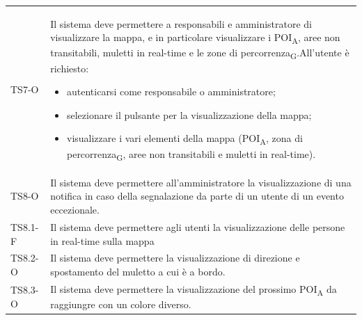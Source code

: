 \begin{longtable}{ >{\centering}p{} >{}p{}}
	TS7-O & Il sistema deve permettere a responsabili e amministratore di visualizzare la mappa, e in particolare visualizzare i POI\textsubscript{A}, aree non transitabili, muletti in real-time e le zone di percorrenza\textsubscript{G}.\newline All'utente è richiesto:\begin{itemize} \item autenticarsi come responsabile o amministratore; \item selezionare il pulsante per la visualizzazione della mappa; \item visualizzare i vari elementi della mappa (POI\textsubscript{A}, zona di percorrenza\textsubscript{G}, aree non transitabili e muletti in real-time). \end{itemize}\tabularnewline
	
	TS8-O & Il sistema deve permettere all'amministratore la visualizzazione di una notifica in caso della segnalazione da parte di un utente di un evento eccezionale.\tabularnewline
	
	TS8.1-F & Il sistema deve permettere agli utenti la visualizzazione delle persone in real-time sulla mappa\tabularnewline
	
	TS8.2-O & Il sistema deve permettere la visualizzazione di direzione e spostamento del muletto a cui è a bordo. \tabularnewline
	
	TS8.3-O & Il sistema deve permettere la visualizzazione del prossimo POI\textsubscript{A} da raggiungre con un colore diverso. \tabularnewline
	

\end{longtable}
